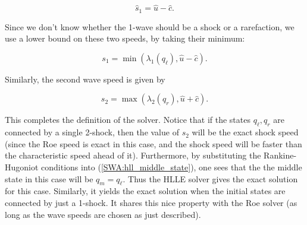 \documentclass{SIAMbook2016}
\begin{document}
\[\hat{s}_1 = \hat{u} - \hat{c}.\]

Since we don't know whether the 1-wave should be a shock or a
rarefaction, we use a lower bound on these two speeds, by taking their
minimum:

\[s_1 = \min\left(\lambda_1(q_\ell), \hat{u}-\hat{c}\right).\]

Similarly, the second wave speed is given by

\[s_2 = \max\left(\lambda_2(q_r), \hat{u}+\hat{c}\right).\]

This completes the definition of the solver. Notice that if the states
\(q_\ell, q_r\) are connected by a single 2-shock, then the value of
\(s_2\) will be the exact shock speed (since the Roe speed is exact in
this case, and the shock speed will be faster than the characteristic
speed ahead of it). Furthermore, by substituting the Rankine-Hugoniot
conditions into (\ref{SWA:hll_middle_state}), one sees that the the
middle state in this case will be \(q_m = q_\ell\). Thus the HLLE solver
gives the exact solution for this case. Similarly, it yields the exact
solution when the initial states are connected by just a 1-shock. It
shares this nice property with the Roe solver (as long as the wave
speeds are chosen as just described).
\end{document}
